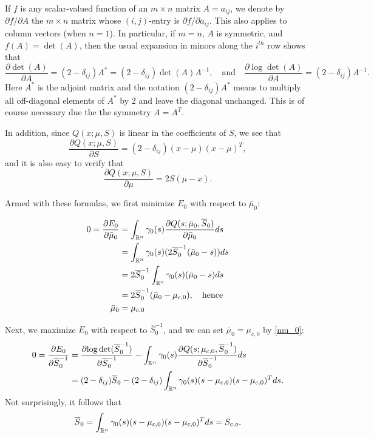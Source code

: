 \documentclass[12pt,leqno]{article}
\begin{document}
If $f$ is any scalar-valued function of an $m\times{n}$ matrix $A = a_{ij}$, we denote by $\partial{f}/\partial{A}$ the 
$m\times{n}$ matrix whose $(i,j)$-entry is $\partial{f}/\partial{a_{ij}}$.  This also applies to column vectors (when $n=1$).
In particular, if $m=n$, $A$ is symmetric, and $f(A) = \det(A)$,  then the usual expansion 
in minors along the $i^{th}$ row shows that 
$$
\frac{\partial{\det(A)}}{\partial{A}} = (2-\delta_{ij})A^* = (2-\delta_{ij})\det(A)A^{-1},\quad\text{and}
\quad\frac{\partial{\log\det(A)}}{\partial{A}} = (2-\delta_{ij})A^{-1}. 
$$
Here $A^*$ is the adjoint matrix and the notation $(2-\delta_{ij})A^*$ means to multiply all off-diagonal elements of $A^*$ by 2
and leave the diagonal unchanged.  This is of course necessary due the the symmetry $A = A^T$.

In addition, since $Q(x;\mu,S)$ is linear in the coefficients of $S$, we see that
$$
\frac{\partial{Q(x;\mu,S)}}{\partial{S}} = (2-\delta_{ij})(x-\mu)(x-\mu)^T,
$$
and it is also easy to verify that
$$
\frac{\partial{Q(x;\mu,S)}}{\partial{\mu}} = 2S(\mu-x).
$$

Armed with these formulas, we first minimize $E_0$ with respect to $\bar{\mu}_0$: 
 
\begin{align}
0 = \frac{\partial{E_0}}{\partial{\bar{\mu}_0}} &= \int_{{\mathbb R}^n}\gamma_0(s)\frac{\partial{Q(s;\bar{\mu}_0,\overline{S}_0)}}{\partial{\bar{\mu}_0}}ds \notag\\
&= \int_{{\mathbb R}^n}\gamma_0(s)(2\overline{S}_0^{-1}(\bar{\mu}_0-s))ds\notag\\
&= 2\overline{S}_0^{-1}\int_{{\mathbb R}^n}\gamma_0(s)(\bar{\mu}_0-s)ds \notag\\
&= 2\overline{S}_0^{-1}(\bar{\mu}_0-\mu_{c,0}), \quad\text{hence}\notag\\
\bar{\mu}_0 &= \mu_{c,0}\label{mu_0}
\end{align}

Next, we maximize $E_0$ with respect to $\overline{S}_0^{-1}$, and we can set $\bar{\mu}_0 = \mu_{c,0}$ by \eqref{mu_0}:
\begin{align*}
0 = \frac{\partial{E_0}}{\partial{\overline{S}_0^{-1}}} &= \frac{\partial{\log\det(\overline{S}_0^{-1})}}{\partial\overline{S}_0^{-1}} - \int_{{\mathbb R}^n}\gamma_0(s)\frac{\partial{Q(s;\mu_{c,0},\overline{S}_0^{-1})}}{\partial{\overline{S}_0^{-1}}}ds \\
&= (2-\delta_{ij})\overline{S}_0 - (2-\delta_{ij})\int_{{\mathbb R}^n}\gamma_0(s)(s-\mu_{c,0})(s-\mu_{c,0})^Tds.
\end{align*}
Not surprisingly, it follows that
\begin{equation}\label{Sigma_0}
  \overline{S}_0 = \int_{{\mathbb R}^n}\gamma_0(s)(s-\mu_{c,0})(s-\mu_{c,0})^Tds = S_{c,o}.
  \end{equation}
\end{document}

